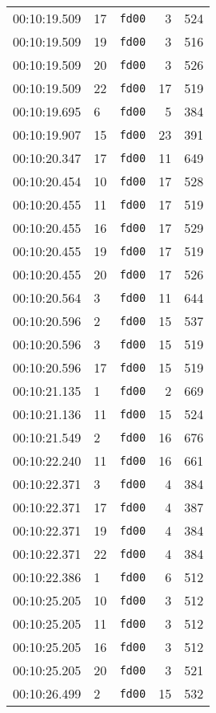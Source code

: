 \documentclass{article}
\begin{document}
\begin{longtable}{lllrr}
00:10:19.509 & 17 & \texttt{fd00} & 3 & 524 \\
00:10:19.509 & 19 & \texttt{fd00} & 3 & 516 \\
00:10:19.509 & 20 & \texttt{fd00} & 3 & 526 \\
00:10:19.509 & 22 & \texttt{fd00} & 17 & 519 \\
00:10:19.695 & 6 & \texttt{fd00} & 5 & 384 \\
00:10:19.907 & 15 & \texttt{fd00} & 23 & 391 \\
00:10:20.347 & 17 & \texttt{fd00} & 11 & 649 \\
00:10:20.454 & 10 & \texttt{fd00} & 17 & 528 \\
00:10:20.455 & 11 & \texttt{fd00} & 17 & 519 \\
00:10:20.455 & 16 & \texttt{fd00} & 17 & 529 \\
00:10:20.455 & 19 & \texttt{fd00} & 17 & 519 \\
00:10:20.455 & 20 & \texttt{fd00} & 17 & 526 \\
00:10:20.564 & 3 & \texttt{fd00} & 11 & 644 \\
00:10:20.596 & 2 & \texttt{fd00} & 15 & 537 \\
00:10:20.596 & 3 & \texttt{fd00} & 15 & 519 \\
00:10:20.596 & 17 & \texttt{fd00} & 15 & 519 \\
00:10:21.135 & 1 & \texttt{fd00} & 2 & 669 \\
00:10:21.136 & 11 & \texttt{fd00} & 15 & 524 \\
00:10:21.549 & 2 & \texttt{fd00} & 16 & 676 \\
00:10:22.240 & 11 & \texttt{fd00} & 16 & 661 \\
00:10:22.371 & 3 & \texttt{fd00} & 4 & 384 \\
00:10:22.371 & 17 & \texttt{fd00} & 4 & 387 \\
00:10:22.371 & 19 & \texttt{fd00} & 4 & 384 \\
00:10:22.371 & 22 & \texttt{fd00} & 4 & 384 \\
00:10:22.386 & 1 & \texttt{fd00} & 6 & 512 \\
00:10:25.205 & 10 & \texttt{fd00} & 3 & 512 \\
00:10:25.205 & 11 & \texttt{fd00} & 3 & 512 \\
00:10:25.205 & 16 & \texttt{fd00} & 3 & 512 \\
00:10:25.205 & 20 & \texttt{fd00} & 3 & 521 \\
00:10:26.499 & 2 & \texttt{fd00} & 15 & 532 \\

\end{longtable}
\end{document}

